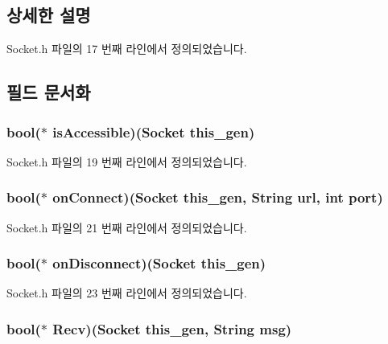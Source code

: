 \subsection{상세한 설명}


Socket.\-h 파일의 17 번째 라인에서 정의되었습니다.



\subsection{필드 문서화}
\hypertarget{struct___socket_ac1ad80a37ffe5c487d7951ba7bb3f825}{
\subsubsection[{is\-Accessible}]{\setlength{\rightskip}{0pt plus 5cm}bool($\ast$  is\-Accessible)({\bf Socket} this\-\_\-gen)}}\label{struct___socket_ac1ad80a37ffe5c487d7951ba7bb3f825}


Socket.\-h 파일의 19 번째 라인에서 정의되었습니다.

\hypertarget{struct___socket_a12fc7a8a0e3742d18dec08defeb67435}{
\subsubsection[{on\-Connect}]{\setlength{\rightskip}{0pt plus 5cm}bool($\ast$  on\-Connect)({\bf Socket} this\-\_\-gen, {\bf String} url, int port)}}\label{struct___socket_a12fc7a8a0e3742d18dec08defeb67435}


Socket.\-h 파일의 21 번째 라인에서 정의되었습니다.

\hypertarget{struct___socket_ad7a809e33935ee525606738714730f7a}{
\subsubsection[{on\-Disconnect}]{\setlength{\rightskip}{0pt plus 5cm}bool($\ast$  on\-Disconnect)({\bf Socket} this\-\_\-gen)}}\label{struct___socket_ad7a809e33935ee525606738714730f7a}


Socket.\-h 파일의 23 번째 라인에서 정의되었습니다.

\hypertarget{struct___socket_a0a7bae2527254e83c0e79cc118dc8744}{
\subsubsection[{Recv}]{\setlength{\rightskip}{0pt plus 5cm}bool($\ast$  Recv)({\bf Socket} this\-\_\-gen, {\bf String} msg)}}\label{struct___socket_a0a7bae2527254e83c0e79cc118dc8744}


